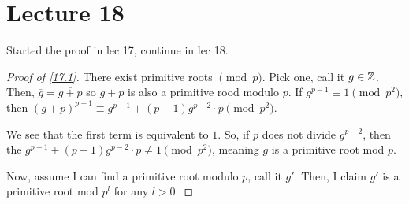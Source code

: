 \documentclass{article}
\begin{document}
\section{Lecture 18}
Started the proof in lec 17, continue in lec 18.
\begin{proof}[Proof of \ref{17.1}]
	There exist primitive roots $\pmod p$. Pick one, call it $g \in \mathbb Z$. Then, $\overline{g} = \overline{g + p}$ so $g + p$ is also a primitive rood modulo $p$. If $g^{p-1} \equiv 1 \pmod{p^2}$, then $(g + p)^{p-1} \equiv g^{p-1} + (p - 1)g^{p-2} \cdot p \pmod{p^2}$.

	We see that the first term is equivalent to $1$. So, if $p$ does not divide $g^{p-2}$, then the $g^{p -1} + (p-1)g^{p-2} \cdot p \neq 1 \pmod{p^2}$, meaning $g$ is a primitive root mod $p$.

	Now, assume I can find a primitive root modulo $p$, call it $g'$. Then, I claim $g'$ is a primitive root mod $p^l$ for any $l > 0$.
\end{proof}
\end{document}
